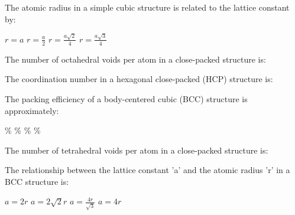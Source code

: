 \begin{question}[2]
The atomic radius in a simple cubic structure is related to the lattice constant by:

\begin{oneparcheckboxes}
\choice $\displaystyle r = a$
\correctchoice $\displaystyle r = \frac{a}{2}$
\choice $\displaystyle r = \frac{a\sqrt{2}}{4}$
\choice $\displaystyle r = \frac{a\sqrt{3}}{4}$
\end{oneparcheckboxes}
\end{question}

\begin{question}[2]
The number of octahedral voids per atom in a close-packed structure is:

\begin{oneparcheckboxes}
\end{oneparcheckboxes}
\end{question}

\begin{question}[2]
The coordination number in a hexagonal close-packed (HCP) structure is:

\begin{oneparcheckboxes}
\end{oneparcheckboxes}
\end{question}

\begin{question}[2]
The packing efficiency of a body-centered cubic (BCC) structure is approximately:

\begin{oneparcheckboxes}
\%
\%
\%
\%
\end{oneparcheckboxes}
\end{question}

\begin{question}[2]
The number of tetrahedral voids per atom in a close-packed structure is:

\begin{oneparcheckboxes}
\end{oneparcheckboxes}
\end{question}

\begin{question}[2]
The relationship between the lattice constant 'a' and the atomic radius 'r' in a BCC structure is:

\begin{oneparcheckboxes}
\choice $\displaystyle a = 2r$
\choice $\displaystyle a = 2\sqrt{2}r$
\correctchoice $\displaystyle a = \frac{4r}{\sqrt{3}}$
\choice $\displaystyle a = 4r$
\end{oneparcheckboxes}
\end{question}

